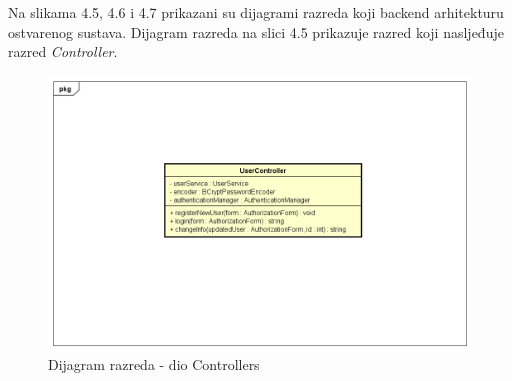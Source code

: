 	  Na slikama 4.5, 4.6 i 4.7 prikazani su dijagrami razreda koji backend arhitekturu ostvarenog sustava. 
	  Dijagram razreda na slici 4.5 prikazuje razred koji nasljeđuje razred \textit{Controller}. 
	  
	  \begin{figure}[H]
			\includegraphics[scale=0.5]{dijagrami/UML_dijagram_razreda_controllers.png} %
			\centering
			\caption{Dijagram razreda - dio Controllers}
			\label{Dijagram razreda - dio Controllers}
		\end{figure}
			
			
			\eject 	
			
